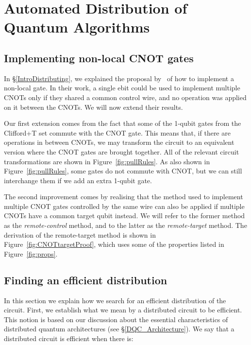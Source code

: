 \chapter{Automated Distribution of Quantum Algorithms}
\label{chap:Project}

\section{Implementing non-local CNOT gates}
\label{NonLocalGates}

In \S\ref{IntroDistributing}, we explained the proposal by~\citet{NonLocalCNOT} of how to implement a non-local gate. In their work, a single ebit could be used to implement multiple CNOTs only if they shared a common control wire, and no operation was applied on it between the CNOTs. We will now extend their results.

Our first extension comes from the fact that some of the 1-qubit gates from the Clifford+T set commute with the CNOT gate. This means that, if there are operations in between CNOTs, we may transform the circuit to an equivalent version where the CNOT gates are brought together. All of the relevant circuit transformations are shown in Figure~\ref{fig:pullRules}. As also shown in Figure~\ref{fig:pullRules}, some gates do not commute with CNOT, but we can still interchange them if we add an extra 1-qubit gate. %



The second improvement comes by realising that the method used to implement multiple CNOT gates controlled by the same wire can also be applied if multiple CNOTs have a common target qubit instead. We will refer to the former method as the \textit{remote-control} method, and to the latter as the \textit{remote-target} method. The derivation of the remote-target method is shown in Figure~\ref{fig:CNOTtargetProof}, which uses some of the properties listed in Figure~\ref{fig:props}.



\section{Finding an efficient distribution}
\label{EfficientDistrib}

In this section we explain how we search for an efficient distribution of the circuit. First, we establish what we mean by a distributed circuit to be efficient. This notion is based on our discussion about the essential characteristics of distributed quantum architectures (see \S\ref{DQC_Architecture}). We say that a distributed circuit is efficient when there is:

